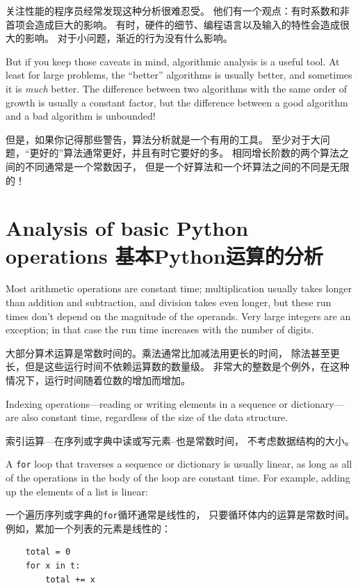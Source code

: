 \documentclass[10pt]{book}
\begin{document}
\begin{CJK}{UTF8}{gbsn}
关注性能的程序员经常发现这种分析很难忍受。
他们有一个观点：有时系数和非首项会造成巨大的影响。
有时，硬件的细节、编程语言以及输入的特性会造成很大的影响。
对于小问题，渐近的行为没有什么影响。

But if you keep those caveats in mind, algorithmic analysis is a
useful tool.  At least for large problems, the ``better'' algorithms
is usually better, and sometimes it is {\em much} better.  The
difference between two algorithms with the same order of growth is
usually a constant factor, but the difference between a good algorithm
and a bad algorithm is unbounded!

但是，如果你记得那些警告，算法分析就是一个有用的工具。
至少对于大问题，``更好的''算法通常更好，并且有时它要好的多。
相同增长阶数的两个算法之间的不同通常是一个常数因子，
但是一个好算法和一个坏算法之间的不同是无限的！

\section{Analysis of basic Python operations 基本Python运算的分析}

Most arithmetic operations are constant time; multiplication
usually takes longer than addition and subtraction, and division
takes even longer, but these run times don't
depend on the magnitude of the operands.  Very large integers
are an exception; in that case the run time increases
with the number of digits.

大部分算术运算是常数时间的。乘法通常比加减法用更长的时间，
除法甚至更长，但是这些运行时间不依赖运算数的数量级。
非常大的整数是个例外，在这种情况下，运行时间随着位数的增加而增加。

Indexing operations---reading or writing elements in a sequence
or dictionary---are also constant time, regardless of the size
of the data structure.

索引运算---在序列或字典中读或写元素--也是常数时间，
不考虑数据结构的大小。

A {\tt for} loop that traverses a sequence or dictionary is
usually linear, as long as all of the operations in the body
of the loop are constant time.  For example, adding up the
elements of a list is linear:

一个遍历序列或字典的{\tt for}循环通常是线性的，
只要循环体内的运算是常数时间。
例如，累加一个列表的元素是线性的：

\begin{verbatim}
    total = 0
    for x in t:
        total += x
\end{verbatim}


\end{CJK}
\end{document}
